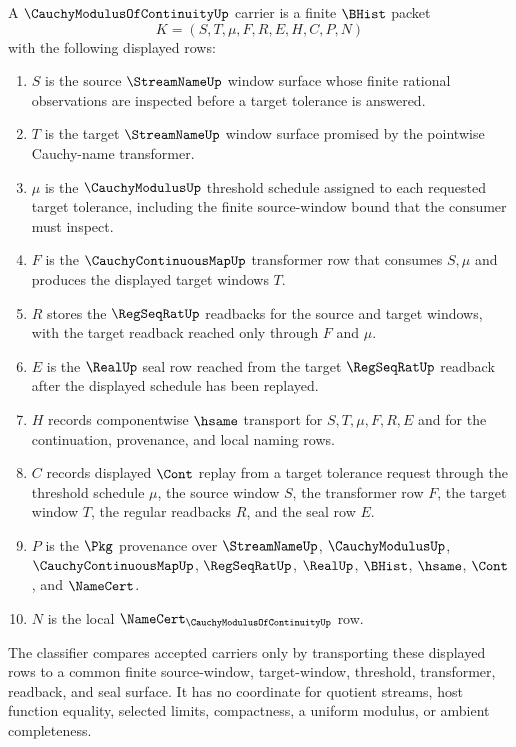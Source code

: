 \begin{definition}
\label{def:cauchy-modulus-of-continuity-carrier}
A $\CauchyModulusOfContinuityUp$ carrier is a finite $\BHist$ packet
$$
K=(S,T,\mu,F,R,E,H,C,P,N)
$$
with the following displayed rows:
\begin{enumerate}
\item $S$ is the source $\StreamNameUp$ window surface whose finite rational
observations are inspected before a target tolerance is answered.
\item $T$ is the target $\StreamNameUp$ window surface promised by the
pointwise Cauchy-name transformer.
\item $\mu$ is the $\CauchyModulusUp$ threshold schedule assigned to each
requested target tolerance, including the finite source-window bound that the
consumer must inspect.
\item $F$ is the $\CauchyContinuousMapUp$ transformer row that consumes
$S,\mu$ and produces the displayed target windows $T$.
\item $R$ stores the $\RegSeqRatUp$ readbacks for the source and target
windows, with the target readback reached only through $F$ and $\mu$.
\item $E$ is the $\RealUp$ seal row reached from the target
$\RegSeqRatUp$ readback after the displayed schedule has been replayed.
\item $H$ records componentwise $\hsame$ transport for $S,T,\mu,F,R,E$ and
for the continuation, provenance, and local naming rows.
\item $C$ records displayed $\Cont$ replay from a target tolerance request
through the threshold schedule $\mu$, the source window $S$, the transformer
row $F$, the target window $T$, the regular readbacks $R$, and the seal row
$E$.
\item $P$ is the $\Pkg$ provenance over $\StreamNameUp$, $\CauchyModulusUp$,
$\CauchyContinuousMapUp$, $\RegSeqRatUp$, $\RealUp$, $\BHist$, $\hsame$,
$\Cont$, and $\NameCert$.
\item $N$ is the local $\NameCert_{\CauchyModulusOfContinuityUp}$ row.
\end{enumerate}
The classifier compares accepted carriers only by transporting these displayed
rows to a common finite source-window, target-window, threshold, transformer,
readback, and seal surface. It has no coordinate for quotient streams, host
function equality, selected limits, compactness, a uniform modulus, or ambient
completeness.
\end{definition}

